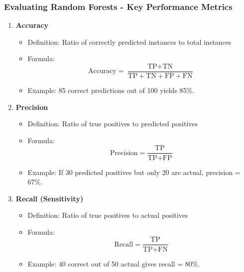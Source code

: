 \documentclass[aspectratio=169]{beamer}
\begin{document}
\begin{frame}[fragile]
    \frametitle{Evaluating Random Forests - Key Performance Metrics}
    \begin{enumerate}
        \item \textbf{Accuracy}
            \begin{itemize}
                \item Definition: Ratio of correctly predicted instances to total instances
                \item Formula: 
                \begin{equation}
                \text{Accuracy} = \frac{\text{TP} + \text{TN}}{\text{TP} + \text{TN} + \text{FP} + \text{FN}}
                \end{equation}
                \item Example: 85 correct predictions out of 100 yields 85\%.
            \end{itemize}

        \item \textbf{Precision}
            \begin{itemize}
                \item Definition: Ratio of true positives to predicted positives
                \item Formula: 
                \begin{equation}
                \text{Precision} = \frac{\text{TP}}{\text{TP} + \text{FP}}
                \end{equation}
                \item Example: If 30 predicted positives but only 20 are actual, precision = 67\%.
            \end{itemize}

        \item \textbf{Recall (Sensitivity)}
            \begin{itemize}
                \item Definition: Ratio of true positives to actual positives
                \item Formula: 
                \begin{equation}
                \text{Recall} = \frac{\text{TP}}{\text{TP} + \text{FN}}
                \end{equation}
                \item Example: 40 correct out of 50 actual gives recall = 80\%.
            \end{itemize}
    \end{enumerate}
\end{frame}
\end{document}
